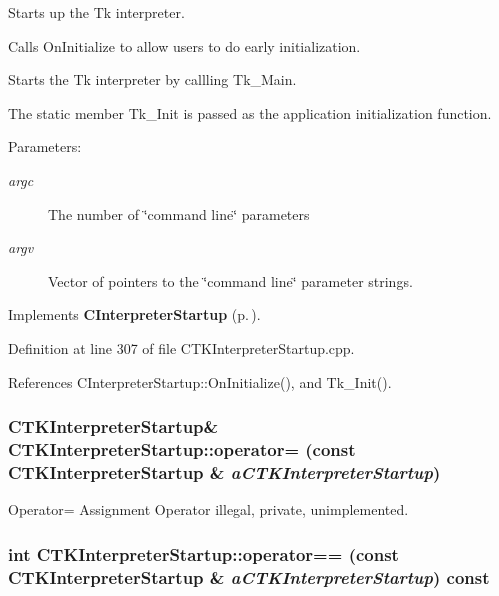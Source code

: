 Starts up the Tk interpreter.

\begin{CompactItemize}
\item 
Calls On\-Initialize to allow users to do early initialization.\item 
Starts the Tk interpreter by callling Tk\_\-Main.\end{CompactItemize}
The static member Tk\_\-Init is passed as  the application initialization function.\begin{Desc}
\item[Parameters: ]\par
\begin{description}
\item[{\em 
argc}]The number of \char`\"{}command line\char`\"{} parameters \item[{\em 
argv}]Vector of pointers to the \char`\"{}command line\char`\"{} parameter strings. \end{description}
\end{Desc}


Implements {\bf CInterpreter\-Startup} {\rm (p.\,\pageref{classCInterpreterStartup_c0})}.

Definition at line 307 of file CTKInterpreter\-Startup.cpp.

References CInterpreter\-Startup::On\-Initialize(), and Tk\_\-Init().
\subsubsection{\setlength{\rightskip}{0pt plus 5cm}CTKInterpreter\-Startup\& CTKInterpreter\-Startup::operator= (const CTKInterpreter\-Startup \& {\em a\-CTKInterpreter\-Startup})\hspace{0.3cm}{\tt  [private]}}\label{classCTKInterpreterStartup_c1}


Operator= Assignment Operator illegal, private, unimplemented.

\subsubsection{\setlength{\rightskip}{0pt plus 5cm}int CTKInterpreter\-Startup::operator== (const CTKInterpreter\-Startup \& {\em a\-CTKInterpreter\-Startup}) const\hspace{0.3cm}{\tt  [private]}}\label{classCTKInterpreterStartup_c2}


